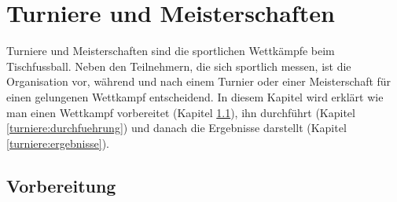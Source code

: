 \chapter{Turniere und Meisterschaften}
\label{turniere}

Turniere und Meisterschaften sind die sportlichen Wettkämpfe beim Tischfussball. 
Neben den Teilnehmern, die sich sportlich messen, ist die Organisation vor, während und nach einem Turnier oder einer Meisterschaft für einen gelungenen Wettkampf entscheidend.
In diesem Kapitel wird erklärt wie man einen Wettkampf vorbereitet (Kapitel \ref{turniere:vorbereitung}), ihn durchführt (Kapitel \ref{turniere:durchfuehrung}) und danach die Ergebnisse darstellt (Kapitel \ref{turniere:ergebnisse}).


 
\section{Vorbereitung}
\label{turniere:vorbereitung}

